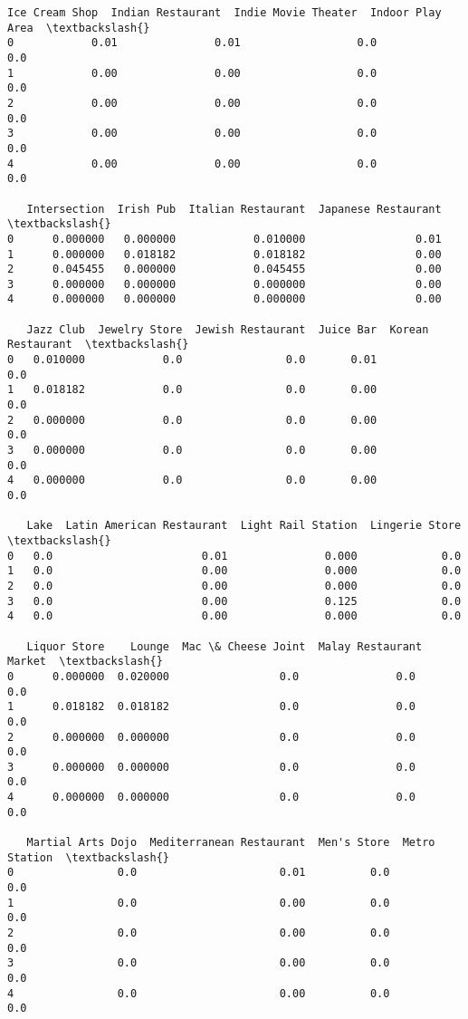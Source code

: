 \documentclass[11pt]{article}
\begin{document}
\begin{tcolorbox}[breakable, size=fbox, boxrule=.5pt, pad at break*=1mm, opacityfill=0]
\begin{Verbatim}[commandchars=\\\{\}]
   Ice Cream Shop  Indian Restaurant  Indie Movie Theater  Indoor Play Area  \textbackslash{}
0            0.01               0.01                  0.0               0.0
1            0.00               0.00                  0.0               0.0
2            0.00               0.00                  0.0               0.0
3            0.00               0.00                  0.0               0.0
4            0.00               0.00                  0.0               0.0

   Intersection  Irish Pub  Italian Restaurant  Japanese Restaurant  \textbackslash{}
0      0.000000   0.000000            0.010000                 0.01
1      0.000000   0.018182            0.018182                 0.00
2      0.045455   0.000000            0.045455                 0.00
3      0.000000   0.000000            0.000000                 0.00
4      0.000000   0.000000            0.000000                 0.00

   Jazz Club  Jewelry Store  Jewish Restaurant  Juice Bar  Korean Restaurant  \textbackslash{}
0   0.010000            0.0                0.0       0.01                0.0
1   0.018182            0.0                0.0       0.00                0.0
2   0.000000            0.0                0.0       0.00                0.0
3   0.000000            0.0                0.0       0.00                0.0
4   0.000000            0.0                0.0       0.00                0.0

   Lake  Latin American Restaurant  Light Rail Station  Lingerie Store  \textbackslash{}
0   0.0                       0.01               0.000             0.0
1   0.0                       0.00               0.000             0.0
2   0.0                       0.00               0.000             0.0
3   0.0                       0.00               0.125             0.0
4   0.0                       0.00               0.000             0.0

   Liquor Store    Lounge  Mac \& Cheese Joint  Malay Restaurant  Market  \textbackslash{}
0      0.000000  0.020000                 0.0               0.0     0.0
1      0.018182  0.018182                 0.0               0.0     0.0
2      0.000000  0.000000                 0.0               0.0     0.0
3      0.000000  0.000000                 0.0               0.0     0.0
4      0.000000  0.000000                 0.0               0.0     0.0

   Martial Arts Dojo  Mediterranean Restaurant  Men's Store  Metro Station  \textbackslash{}
0                0.0                      0.01          0.0            0.0
1                0.0                      0.00          0.0            0.0
2                0.0                      0.00          0.0            0.0
3                0.0                      0.00          0.0            0.0
4                0.0                      0.00          0.0            0.0


\end{Verbatim}
\end{tcolorbox}
\end{document}

